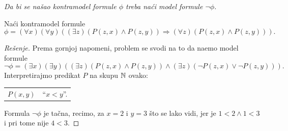\begin{NAP}\it
  Da bi se na\v sao kontramodel formule $\phi$ treba na\'ci model formule $\lnot \phi$.
\end{NAP}

\begin{EX}
  Na\'ci kontramodel formule
  $$
    \phi = (\forall x)(\forall y)((\exists z)(P(z, x) \land P(z, y)) \Rightarrow (\forall z)(P(z, x) \land P(z, y))).
  $$
\end{EX}
\begin{proof}[Re\v senje]
  Prema gornjoj napomeni, problem se svodi na to da na\dj emo model formule
  $$
    \lnot \phi = (\exists x)(\exists y)((\exists z)(P(z, x) \land P(z, y)) \land (\exists z)(\lnot P(z, x) \lor \lnot P(z, y))).
  $$
  Interpretirajmo predikat $P$ na skupu $\mathbb{N}$ ovako:
  
  \medskip

  \begin{tabular}{l@{\quad$\leadsto$\quad}l}
    $P(x, y)$ & \enquote{$x < y$}.
  \end{tabular}
  
  \medskip
  
  \noindent
  Formula $\lnot\phi$ je ta\v cna, recimo, za $x = 2$ i $y = 3$ \v sto se lako vidi, jer je
  $1 < 2 \land 1 < 3$ i pri tome nije $4 < 3$.
\end{proof}

\ifBIOINF
  \endinput
\fi

\section{Uvo\dj enje novih kvantifikatora}

\v Ceste su situacije kada \v zelimo da ka\v zemo da \emph{postoji ta\v cno jedan objekat} sa nekom
osobinom~$\phi$. Formula
$$
  (\exists x) \phi(x)
$$
ka\v ze da objekat sa tom osobinom postoji, ali ne garantuje da je on jedinstven.
Kvantifikator $\exists$ mo\v ze da se unapredi do kvantifikatora $\exists!$ koga \v citamo
\enquote{postoji samo jedno}. Interesantno je da se ovim ne unosi nova izra\v zajna mo\'c u predikatski ra\v cun,
jer se formula
$$
  (\exists! x) \phi(x)
$$
(\enquote{postoji samo jedno $x$ sa osobinom $\phi(x)$}) mo\v ze shvatiti kao \enquote{skra\'cenica} za:
$$
  \underbrace{(\exists x) \phi(x)}_{\text{egzistencija}} \quad \land \quad
  \underbrace{(\forall y)(\forall z)(\phi(y) \land \phi(z) \Rightarrow y = z)}_{\text{jedinstvenost}}.
$$


